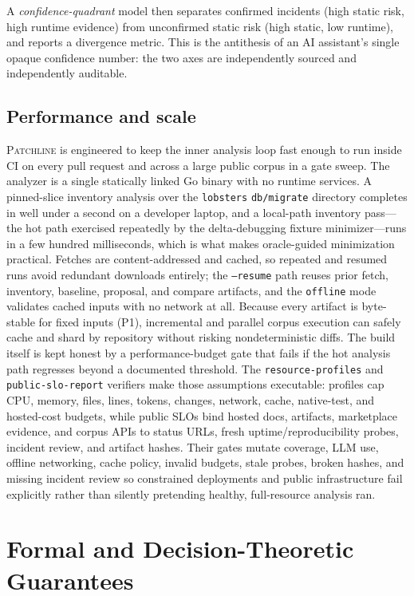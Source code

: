 \documentclass[11pt]{article}
\newcommand{\tool}{\textsc{Patchline}}
\newcommand{\code}[1]{\texttt{#1}}
\begin{document}
\noindent
A \emph{confidence-quadrant} model then separates confirmed incidents (high static risk, high runtime
evidence) from unconfirmed static risk (high static, low runtime), and reports a divergence metric.
This is the antithesis of an AI assistant's single opaque confidence number: the two axes are
independently sourced and independently auditable.

\subsection{Performance and scale}
\tool{} is engineered to keep the inner analysis loop fast enough to run inside CI on every pull
request and across a large public corpus in a gate sweep. The analyzer is a single statically linked
Go binary with no runtime services. A pinned-slice inventory analysis over the \code{lobsters}
\code{db/migrate} directory completes in well under a second on a developer laptop, and a local-path
inventory pass---the hot path exercised repeatedly by the delta-debugging fixture minimizer---runs in
a few hundred milliseconds, which is what makes oracle-guided minimization practical. Fetches are
content-addressed and cached, so repeated and resumed runs avoid redundant downloads entirely; the
\code{--resume} path reuses prior fetch, inventory, baseline, proposal, and compare artifacts, and the
\code{offline} mode validates cached inputs with no network at all. Because every artifact is
byte-stable for fixed inputs (P1), incremental and parallel corpus execution can safely cache and
shard by repository without risking nondeterministic diffs. The build itself is kept honest by a
performance-budget gate that fails if the hot analysis path regresses beyond a documented threshold.
The \code{resource-profiles} and \code{public-slo-report} verifiers make those assumptions executable:
profiles cap CPU, memory, files, lines, tokens, changes, network, cache, native-test, and hosted-cost
budgets, while public SLOs bind hosted docs, artifacts, marketplace evidence, and corpus APIs to status
URLs, fresh uptime/reproducibility probes, incident review, and artifact hashes. Their gates mutate
coverage, LLM use, offline networking, cache policy, invalid budgets, stale probes, broken hashes, and
missing incident review so constrained deployments and public infrastructure fail explicitly rather than
silently pretending healthy, full-resource analysis ran.

\section{Formal and Decision-Theoretic Guarantees}
\label{sec:formal}
\end{document}

